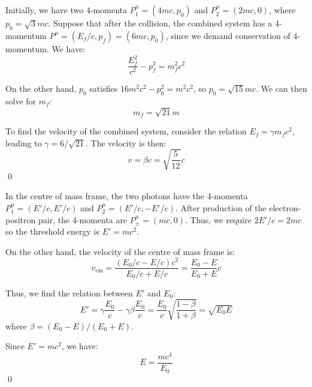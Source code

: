 \documentclass[12pt]{article}
\begin{document}



\pagebreak
\section*{}


Initially, we have two 4-momenta $P_{1}^{\mu} = (4mc, p_{0})$ and $P_{2}^{\mu} = (2mc, 0)$, where $p_{0} = \sqrt{3}mc$. Suppose that after the collision, the combined system has a 4-momentum $P^{\mu} = (E_{f}/c, p_{f}) =(6mc, p_{0})$, since we demand conservation of 4-momentum. We have:
\begin{equation}
    \frac{E_{f}^{2}}{c^{2}} - p_{f}^{2} = m_{f}^{2}c^{2}
\end{equation}

On the other hand, $p_{0}$ satisfies $16m^{2}c^{2} - p_{0}^{2} = m^{2}c^{2}$, so $p_{0} = \sqrt{15}mc$. We can then solve for $m_{f}$:
\begin{equation}
    m_{f} = \sqrt{21} m
\end{equation}

To find the velocity of the combined system, consider the relation $E_{f} = \gamma m_{f}c^{2}$, leading to $\gamma = 6/\sqrt{21}$. The velocity is then:
\begin{equation}
    v = \beta c = \sqrt{\frac{5}{12}} c
\end{equation}
\qed


In the centre of mass frame, the two photons have the 4-momenta $P_{1}^{\mu} = (E'/c, E'/c)$ and $P_{2}^{\mu} = (E'/c, -E'/c)$. After production of the electron-positron pair, the 4-momenta are $P_{\pm}^{\mu} = (mc, 0)$. Thus, we require $2E'/c = 2mc$ so the threshold energy is $E' = mc^{2}$.

On the other hand, the velocity of the centre of mass frame is:
\begin{equation}
    v_{\text{cm}} = \frac{(E_{0}/c - E/c) c^{2}}{E_{0}/c + E/c} = \frac{E_{0} - E}{E_{0} + E} c
\end{equation}

Thus, we find the relation between $E'$ and $E_{0}$:
\begin{equation}
    E' = \gamma \frac{E_{0}}{c} - \gamma \beta \frac{E_{0}}{c} = \frac{E_{0}}{c} \sqrt{\frac{1 - \beta}{1 + \beta}} = \sqrt{E_{0} E}
\end{equation}
where $\beta = (E_{0} - E)/(E_{0} + E)$.

Since $E' = mc^{2}$, we have:
\begin{equation}
    E = \frac{mc^{4}}{E_{0}}
\end{equation}
\qed
\end{document}
